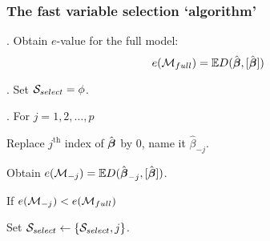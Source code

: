 \documentclass[10pt]{beamer}
\theoremstyle{definition}
\begin{document}
\begin{frame}[fragile]
\frametitle{The fast variable selection `algorithm'}

\begin{minipage}[b]{.6\textwidth}
%
%
%
. Obtain $e$-value for the full model:
$$
e({\cal{M}}_{full}) = {\mathbb{E}} D ( \hat{{\boldsymbol{\beta}}}, [ \hat {{\boldsymbol{\beta}}}] )
$$

. Set ${\cal{S}}_{select} = \phi$.
\vspace{1em}

. For $j = 1, 2, \ldots, p$

\hspace{1em} Replace $j^\text{th}$ index of $\hat{{\boldsymbol{\beta}}}$ by 0, name it $\hat \beta_{-j}$.

\hspace{1em} Obtain $e({\cal{M}}_{-j}) = {\mathbb{E}} D ( \hat{{\boldsymbol{\beta}}}_{-j}, [ \hat {{\boldsymbol{\beta}}}] )$.

\hspace{1em} If $e({\cal{M}}_{-j}) < e({\cal{M}}_{full})$

\hspace{2em} Set $ {\cal{S}}_{select} \leftarrow \{ {\cal{S}}_{select}, j \} $.
\vspace{1em}


\end{minipage}
\end{frame}
\end{document}
